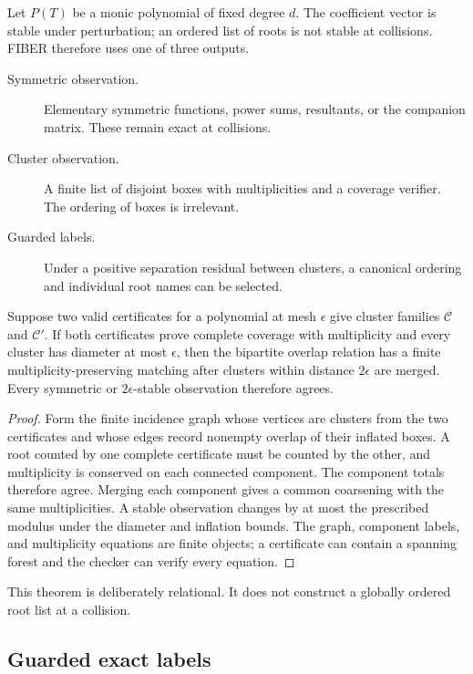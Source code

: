 Let \(P(T)\) be a monic polynomial of fixed degree \(d\).  The coefficient
vector is stable under perturbation; an ordered list of roots is not stable at
collisions.  FIBER therefore uses one of three outputs.

\begin{description}
\item[Symmetric observation.] Elementary symmetric functions, power sums,
      resultants, or the companion matrix.  These remain exact at collisions.
\item[Cluster observation.] A finite list of disjoint boxes with multiplicities
      and a coverage verifier.  The ordering of boxes is irrelevant.
\item[Guarded labels.] Under a positive separation residual between clusters,
      a canonical ordering and individual root names can be selected.
\end{description}

\begin{theorem}
Suppose two valid certificates for a polynomial at mesh \(\epsilon\) give
cluster families \(\mathcal C\) and \(\mathcal C'\).  If both certificates
prove complete coverage with multiplicity and every cluster has diameter at
most \(\epsilon\), then the bipartite overlap relation has a finite
multiplicity-preserving matching after clusters within distance
\(2\epsilon\) are merged.  Every symmetric or \(2\epsilon\)-stable observation
therefore agrees.
\end{theorem}

\begin{proof}
Form the finite incidence graph whose vertices are clusters from the two
certificates and whose edges record nonempty overlap of their inflated boxes.
A root counted by one complete certificate must be counted by the other, and
multiplicity is conserved on each connected component.  The component totals
therefore agree.  Merging each component gives a common coarsening with the
same multiplicities.  A stable observation changes by at most the prescribed
modulus under the diameter and inflation bounds.  The graph, component labels,
and multiplicity equations are finite objects; a certificate can contain a
spanning forest and the checker can verify every equation.
\end{proof}

This theorem is deliberately relational.  It does not construct a globally
ordered root list at a collision.

\subsection{Guarded exact labels}

